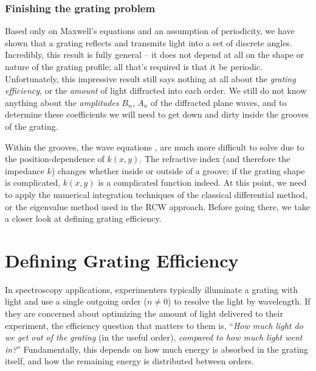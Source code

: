 \subsubsection{Finishing the grating problem}
Based only on Maxwell's equations and an assumption of periodicity, we have shown that a grating reflects and transmits light into a set of discrete angles.  Incredibly, this result is fully general -- it does not depend at all on the shape or nature of the grating profile; all that's required is that it be periodic.  Unfortunately, this impressive result still says nothing at all about the \emph{grating efficiency}, or the \emph{amount} of light diffracted into each order.  We still do not know anything about the \emph{amplitudes} $B_n$, $A_n$ of the diffracted plane waves, and to determine these coefficients we will need to get down and dirty inside the grooves of the grating.

Within the grooves, the wave equations ,  are much more difficult to solve due to the position-dependence of $k(x,y)$.  The refractive index (and therefore the impedance $k$) changes whether inside or outside of a groove; if the grating shape is complicated, $k(x,y)$ is a complicated function indeed.
At this point, we need to apply the numerical integration techniques of the classical differential method, or the eigenvalue method used in the RCW approach.  Before going there, we take a closer look at defining grating efficiency.


\section{Defining Grating Efficiency}
In spectroscopy applications, experimenters typically illuminate a grating with light and use a single outgoing order ($n\neq0$) to resolve the light by wavelength.  If they are concerned about optimizing the amount of light delivered to their experiment, the efficiency question that matters to them is, ``\emph{How much light do we get out of the grating} (in the useful order), \emph{compared to how much light went in?}''  Fundamentally, this depends on how much energy is absorbed in the grating itself, and how the remaining energy is distributed between orders.

